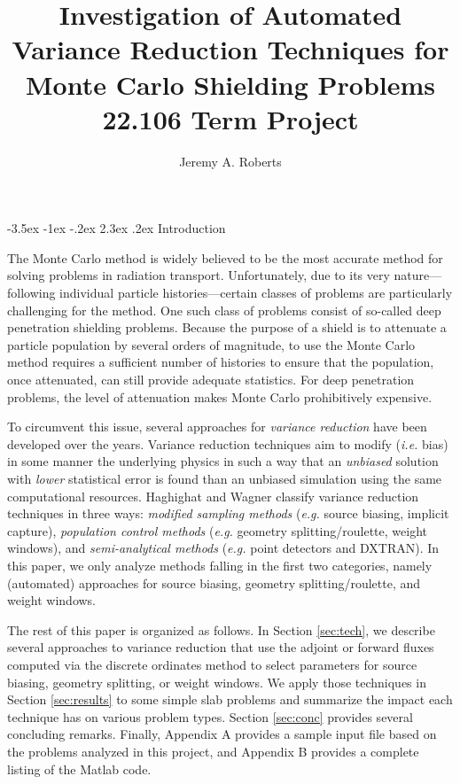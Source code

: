\documentclass[letter,11pt]{article}
\makeatletter
\renewcommand\section{\@startsection{section}{1}{\z@}%
                                {-3.5ex \@plus -1ex \@minus -.2ex}%
                                {2.3ex \@plus.2ex}%
                                {\normalfont\large\bf}}
\newcommand{\eg}{{\it e.g. }}
\newcommand{\ie}{{\it i.e. }}
\makeatother
\begin{document}
{\small
\title{\Large{{\bf Investigation of Automated Variance Reduction Techniques for Monte Carlo Shielding Problems}} \\
       \large{{\bf 22.106 Term Project}} }
\author{Jeremy A. Roberts} }
\date{}
\maketitle


\section{Introduction}

The Monte Carlo method is widely believed to be the most accurate method for solving problems in radiation transport.  Unfortunately, due to its very nature---following individual particle histories---certain classes of problems are particularly challenging for the method.  One such class of problems consist of so-called deep penetration shielding problems.  Because the purpose of a shield is to attenuate a particle population by several orders of magnitude, to use the Monte Carlo method requires a sufficient number of histories to ensure that the population, once attenuated, can still provide adequate statistics.  For deep penetration problems, the level of attenuation makes Monte Carlo prohibitively expensive.

To circumvent this issue, several approaches for {\it variance reduction} have been developed over the years.  Variance reduction techniques aim to modify (\ie bias) in some manner the underlying physics in such a way that an {\it unbiased} solution with {\it lower} statistical error is found than an unbiased simulation using the same computational resources.  Haghighat and Wagner \cite{haghighat2003mcv} classify variance reduction techniques in three ways: {\it modified sampling methods} (\eg source biasing, implicit capture), {\it population control methods} (\eg geometry splitting/roulette, weight windows), and {\it semi-analytical methods} (\eg point detectors and DXTRAN).  In this paper, we only analyze methods falling in the first two categories, namely (automated) approaches for source biasing, geometry splitting/roulette, and weight windows.

The rest of this paper is organized as follows.  In Section \ref{sec:tech}, we describe several approaches to variance reduction that use the adjoint or forward fluxes computed via the discrete ordinates method to select parameters for source biasing, geometry splitting, or weight windows. We apply those techniques in Section \ref{sec:results} to some simple slab problems and summarize the impact each technique has on various problem types. Section \ref{sec:conc} provides several concluding remarks.  Finally, Appendix A provides a sample input file based on the problems analyzed in this project, and Appendix B provides a complete listing of the Matlab code.
\end{document}
